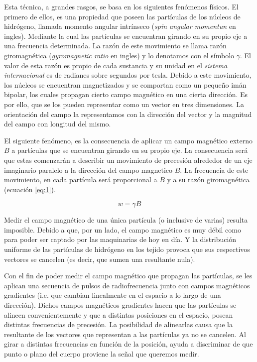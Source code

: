 \documentclass[11pt,a4paper,twoside]{tesis}
\begin{document}
Esta t\'ecnica, a grandes rasgos, se basa en los siguientes fen\'omenos f\'isicos. El primero de 
ellos, es 
una propiedad que poseen las part\'iculas de los n\'ucleos de hidr\'ogeno, 
llamada momento angular intrínseco (\textit{spin angular momentun} en ingles). 
Mediante la cual las part\'iculas se encuentran girando en su 
propio eje a una frecuencia determinada. La razón de este movimiento se llama razón 
giromagnética (\textit{gyromagnetic 
ratio} en ingles) y lo denotamos con el símbolo $\gamma$. El valor de esta 
razón es propio de cada sustancia y su unidad en el 
\textit{sistema internacional} es de radianes sobre segundos por tesla. Debido 
a este movimiento, los n\'ucleos se encuentran 
magnetizados y se comportan como un peque\~no im\'an bipolar, los cuales 
propagan cierto campo magn\'etico en una cierta direcci\'on. Es por ello, que se los pueden 
representar como un vector en tres dimensiones. La orientaci\'on del campo la representamos con 
la direcci\'on del vector y la magnitud del campo con longitud del mismo.

El siguiente fen\'omeno, es la consecuencia de aplicar un campo magnético externo $B$ a partículas que se 
encuentran girando en su propio eje. La consecuencia será que estas comenzarán a describir un 
movimiento de precesi\'on alrededor de un eje imaginario paralelo a la direcci\'on del campo 
magnetico $B$. La frecuencia de este movimiento, en cada part\'icula será proporcional a $B$ y a su 
razón giromagnética (ecuación \ref{eq:1}).

\begin{equation} 
\label{eq:1}
 w=\gamma  B
\end{equation}


Medir el campo magn\'etico de una \'unica part\'icula (o inclusive de varias) resulta imposible. 
Debido a que, por un lado, el campo magn\'etico es muy d\'ebil como para poder ser captado por las 
maquinarias de hoy en d\'ia. Y la distribuci\'on uniforme de las part\'iculas 
de hidr\'ogeno en los tejido provoca que sus respectivos vectores se cancelen (es decir, que sumen 
una resultante nula). 

Con el fin de poder medir el campo magnético que propagan las partículas, se les aplican una 
secuencia de pulsos de radiofrecuencia junto con campos magnéticos gradientes (i.e. que cambian 
linealmente en el espacio a lo largo de una direcci\'on). Dichos campos magn\'eticos gradientes 
hacen que las part\'iculas se alineen convenientemente y que a distintas posiciones en el espacio, 
posean distintas frecuencias de precesi\'on. La posibilidad de alinearlas causa que la resultante de 
los vectores que representan a las part\'iculas ya no se cancelen. Al girar a distintas 
frecuencias en funci\'on de la posici\'on, ayuda a discriminar de que punto o plano del cuerpo 
proviene la se\~nal que queremos medir.
\end{document}
